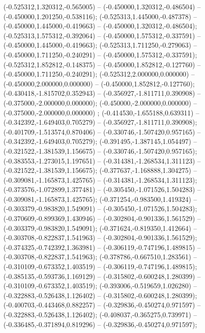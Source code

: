  (-0.525312,1.320312,-0.565005) -- (-0.450000,1.320312,-0.486504) -- (-0.450000,1.201250,-0.538116);
 (-0.525313,1.445000,-0.487378) -- (-0.450000,1.445000,-0.419663) -- (-0.450000,1.320312,-0.486504);
 (-0.525313,1.575312,-0.392064) -- (-0.450000,1.575312,-0.337591) -- (-0.450000,1.445000,-0.419663);
 (-0.525313,1.711250,-0.279063) -- (-0.450000,1.711250,-0.240291) -- (-0.450000,1.575312,-0.337591);
 (-0.525312,1.852812,-0.148375) -- (-0.450000,1.852812,-0.127760) -- (-0.450000,1.711250,-0.240291);
 (-0.525312,2.000000,0.000000) -- (-0.450000,2.000000,0.000000) -- (-0.450000,1.852812,-0.127760);
 (-0.430418,-1.815702,0.352943) -- (-0.356927,-1.811711,0.390908) -- (-0.375000,-2.000000,0.000000);
 (-0.450000,-2.000000,0.000000) -- (-0.375000,-2.000000,0.000000) ;
 (-0.414530,-1.655188,0.639311) -- (-0.342392,-1.649403,0.705279) -- (-0.356927,-1.811711,0.390908);
 (-0.401709,-1.513574,0.870406) -- (-0.330746,-1.507420,0.957165) -- (-0.342392,-1.649403,0.705279);
 (-0.391495,-1.387145,1.054497) -- (-0.321522,-1.381539,1.156675) -- (-0.330746,-1.507420,0.957165);
 (-0.383553,-1.273015,1.197651) -- (-0.314381,-1.268534,1.311123) -- (-0.321522,-1.381539,1.156675);
 (-0.377637,-1.168888,1.304275) -- (-0.309081,-1.165873,1.425765) -- (-0.314381,-1.268534,1.311123);
 (-0.373576,-1.072899,1.377481) -- (-0.305450,-1.071526,1.504283) -- (-0.309081,-1.165873,1.425765);
 (-0.371254,-0.983500,1.419324) -- (-0.303379,-0.983820,1.549091) -- (-0.305450,-1.071526,1.504283);
 (-0.370609,-0.899369,1.430946) -- (-0.302804,-0.901336,1.561529) -- (-0.303379,-0.983820,1.549091);
 (-0.371624,-0.819350,1.412664) -- (-0.303708,-0.822837,1.541963) -- (-0.302804,-0.901336,1.561529);
 (-0.374325,-0.742392,1.363981) -- (-0.306119,-0.747196,1.489815) -- (-0.303708,-0.822837,1.541963);
 (-0.378786,-0.667510,1.283561) -- (-0.310109,-0.673352,1.403519) -- (-0.306119,-0.747196,1.489815);
 (-0.385135,-0.593736,1.169129) -- (-0.315802,-0.600248,1.280399) -- (-0.310109,-0.673352,1.403519);
 (-0.393006,-0.519659,1.026280) -- (-0.322883,-0.526438,1.126402) -- (-0.315802,-0.600248,1.280399);
 (-0.400703,-0.443468,0.882257) -- (-0.329836,-0.450274,0.971597) -- (-0.322883,-0.526438,1.126402);
 (-0.408037,-0.365275,0.739971) -- (-0.336485,-0.371894,0.819296) -- (-0.329836,-0.450274,0.971597);
